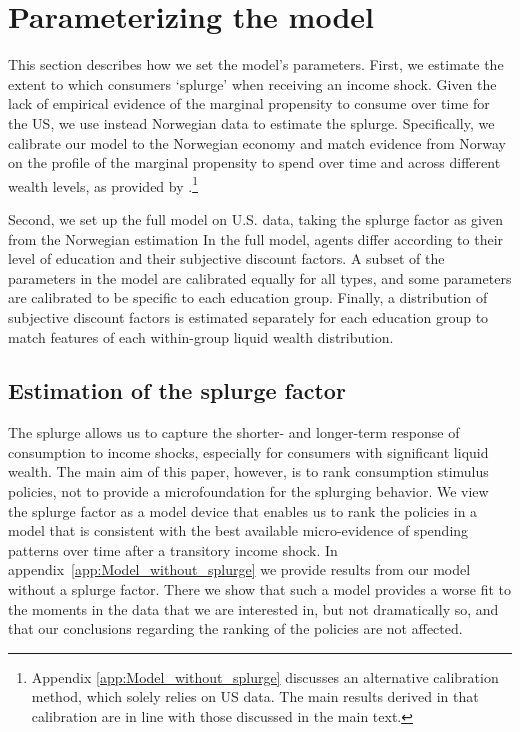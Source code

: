 \documentclass[\econtexRoot/HAFiscal]{subfiles}
\begin{document}
\hypertarget{parameterizing-the-model}{}\par\section{Parameterizing the model}

This section describes how we set the model's parameters. First, we estimate the extent to which consumers `splurge' when receiving an income shock. Given the lack of empirical evidence of the marginal propensity to consume over time for the US, we use instead Norwegian data to estimate the splurge. Specifically, we calibrate our model to the Norwegian economy and match evidence from Norway on the profile of the marginal propensity to spend over time and across different wealth levels, as provided by \citet{fagereng_mpc_2021}.\footnote{Appendix \ref{app:Model_without_splurge} discusses an alternative calibration method, which solely relies on US data. The main results derived in that calibration are in line with those discussed in the main text.} 

Second, we set up the full model on U.S. data, taking the splurge factor as given from the Norwegian estimation In the full model, agents differ according to their level of education and their subjective discount factors. A subset of the parameters in the model are calibrated equally for all types, and some parameters are calibrated to be specific to each education group. Finally, a distribution of subjective discount factors is estimated separately for each education group to match features of each within-group liquid wealth distribution.


\hypertarget{estimation-of-the-splurge-factor}{}\par\subsection{Estimation of the splurge factor}
\notinsubfile{\label{sec:splurge}}

The splurge allows us to capture the shorter- and longer-term response of consumption to income shocks, especially for consumers with significant liquid wealth. The main aim of this paper, however, is to rank consumption stimulus policies, not to provide a microfoundation for the splurging behavior. We view the splurge factor as a model device that enables us to rank the policies in a model that is consistent with the best available micro-evidence of spending patterns over time after a transitory income shock. In appendix~\ref{app:Model_without_splurge} we provide results from our model without a splurge factor. There we show that such a model provides a worse fit to the moments in the data that we are interested in, but not dramatically so, and that our conclusions regarding the ranking of the policies are not affected.
\end{document}
